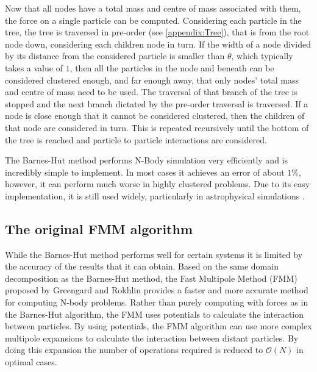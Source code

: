 Now that all nodes have a total mass and centre of mass associated with them, the force on a single particle can be computed. Considering each particle in the tree, the tree is traversed in pre-order (see \cref{appendix:Tree}), that is from the root node down, considering each children node in turn. If the width of a node divided by its distance from the considered particle is smaller than $\theta$, which typically takes a value of $1$, then all the particles in the node and beneath can be considered clustered enough, and far enough away, that only nodes' total mass and centre of mass need to be used. The traversal of that branch of the tree is stopped and the next branch dictated by the pre-order traversal is traversed. If a node is close enough that it cannot be considered clustered, then the children of that node are considered in turn. This is repeated recursively until the bottom of the tree is reached and particle to particle interactions are considered.

The Barnes-Hut method performs N-Body simulation very efficiently and is incredibly simple to implement. In most cases it achieves an error of about $1\%$, however, it can perform much worse in highly clustered problems. Due to its easy implementation, it is still used widely, particularly in astrophysical simulations \cite{Gaburov2010,Capuzzo-DolcettaIstitutoAstronomico,Ishiyama20124.45Problem,Iwasawa2019ImplementationC,Rein2013Large-scaleRings}.

\FloatBarrier
\subsection{The original FMM algorithm}

While the Barnes-Hut method performs well for certain systems it is limited by the accuracy of the results that it can obtain. Based on the same domain decomposition as the Barnes-Hut method, the Fast Multipole Method (FMM) proposed by Greengard and Rokhlin \cite{1988The0-262-7110-X.,Rokhlin1985RapidTheory,Greengard1987ASimulations} provides a faster and more accurate method for computing N-body problems. Rather than purely computing with forces as in the Barnes-Hut algorithm, the FMM uses potentials to calculate the interaction between particles. By using potentials, the FMM algorithm can use more complex multipole expansions to calculate the interaction between distant particles. By doing this expansion the number of operations required is reduced to $\mathcal{O}(N)$ in optimal cases.

